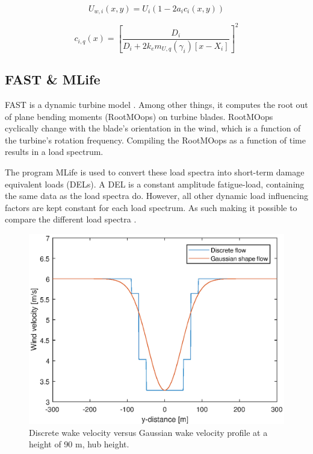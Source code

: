 \begin{equation}
\label{eq:Uw}
U_{w,i}(x,y) = U_i\left( {1-2a_{i}c_{i}(x,y)} \right)
\end{equation} 

\begin{equation}
\label{eq:c}
c_{i,q}(x) = \left[ \frac{D_i}{D_i + 2k_em_{U,q}(\gamma_i)[x - X_i]} \right]^2
\end{equation}



\subsection{FAST \& MLife} \label{sec:fast} FAST is a dynamic turbine model \cite{Jonkman2005}. Among other things, it computes the root out of plane bending moments (RootMOops) on turbine blades. RootMOops cyclically change with the blade's orientation in the wind, which is a function of the turbine's rotation frequency. Compiling the RootMOops as a function of time results in a load spectrum.

The program MLife is used to convert these load spectra into short-term damage equivalent loads (DELs). A DEL is a constant amplitude fatigue-load, containing the same data as the load spectra do. However, all other dynamic load influencing factors are kept constant for each load spectrum. As such making it possible to compare the different load spectra \cite{Wilson2017, MLife}.


\begin{figure}
  \includegraphics[width=\linewidth]{./Figures/PlotGausDiscWakeDWake180U6yaw0.eps} %
  \caption{Discrete wake velocity versus Gaussian wake velocity profile at a height of 90 m, hub height.} %
  \label{fig:disgaus}
\end{figure}


